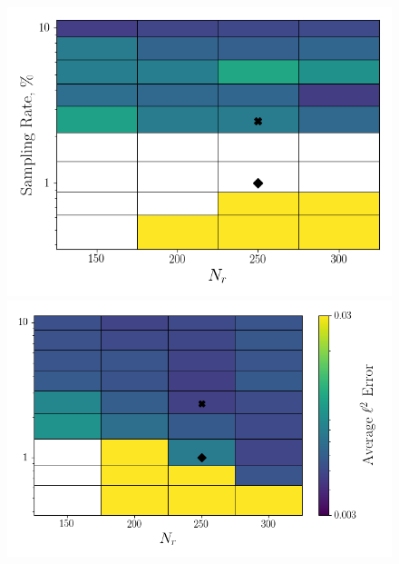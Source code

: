\begin{figure}
	\begin{minipage}{0.46\linewidth}
		\includegraphics[width=0.99\linewidth]{Chapters/HPROMResults/Images/cavity/deim/err_contour_random_dt5e-6.png}
	\end{minipage}
	\begin{minipage}{0.53\linewidth}
		\includegraphics[width=0.99\linewidth]{Chapters/HPROMResults/Images/cavity/deim/err_contour_eigenvec_dt5e-6.png}
	\end{minipage}


\end{figure}
